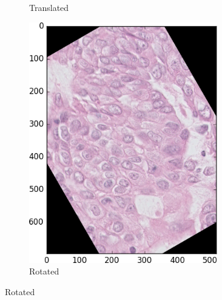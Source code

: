 \documentclass[a4paper,10pt]{article}
\begin{document}
\begin{figure}
\begin{multicols}{3}
\begin{subfigure}{0.3\textwidth}
    \caption{Translated}
    \label{fig:shift}
	\end{subfigure}%
	\begin{subfigure}{0.3\textwidth}
    \includegraphics[width=0.9\textwidth]{rot.png}\par 
     \caption{Rotated}
     \label{fig:rot}
	\end{subfigure}%
\end{multicols}
\begin{multicols}{3}


\end{multicols}
\end{figure}
\end{document}
